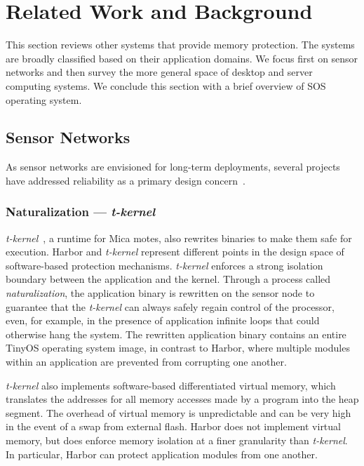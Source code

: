 \section{Related Work and Background}
\label{sec:related}
%
This section reviews other systems that provide memory protection.
%
The systems are broadly classified based on their application
domains.
%
We focus first on sensor networks and then survey the more general
space of desktop and server computing systems.
%
We conclude this section with a brief overview of SOS operating system.
%
\subsection{Sensor Networks}
%
As sensor networks are envisioned for long-term deployments, several
projects have addressed reliability as a primary design
concern~\cite{tkernel06sensys,regehr06utos,dutta05ipsn}.
\subsubsection{Naturalization --- \emph{t-kernel}}
%
\emph{t-kernel}~\cite{tkernel06sensys}, a runtime for Mica motes, also
rewrites binaries to make them safe for execution.
%
Harbor and \emph{t-kernel} represent different points in the design space of
software-based protection mechanisms.
%
\emph{t-kernel} enforces a strong isolation boundary between the application and
the kernel.
%
Through a process called \emph{naturalization}, the application binary is
rewritten on the sensor node to guarantee that the \emph{t-kernel} can
always safely regain control of the processor, even, for example, in the
presence of application infinite loops that could otherwise hang the
system.
%
The rewritten application binary contains an entire TinyOS operating system
image, in contrast to Harbor, where multiple modules within an
application are prevented from corrupting one another.
%


\emph{t-kernel} also implements software-based differentiated
virtual memory,
%
which translates the addresses for all memory accesses made by a program
into the heap segment.
%
The overhead of virtual memory is unpredictable and can be very
high in the event of a swap from external flash.
%
Harbor does not implement virtual memory, but does enforce memory isolation at a
finer granularity than \emph{t-kernel}.
%
In particular, Harbor can protect application modules from
one another.
%

